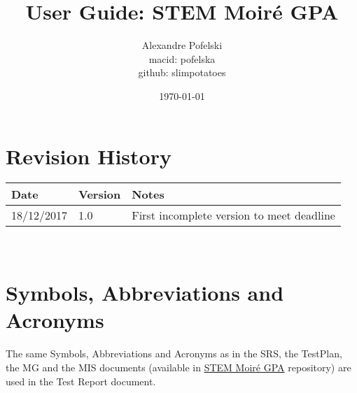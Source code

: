 \documentclass[12pt, titlepage]{article}
\newcommand{\progname}{STEM Moir{\'e} GPA}
\begin{document}
\title{User Guide: STEM Moir{\'e} GPA} 
\author{Alexandre Pofelski \\
		macid: pofelska \\
		github: slimpotatoes}
\date{\today}
	
\maketitle


\section{Revision History}

\begin{tabularx}{\textwidth}{p{3cm}p{2cm}X}
\toprule {\bf Date} & {\bf Version} & {\bf Notes}\\
\midrule
18/12/2017 & 1.0 & First incomplete version to meet deadline\\
\bottomrule
\end{tabularx}

~\newpage

\section{Symbols, Abbreviations and Acronyms}

The same Symbols, Abbreviations and Acronyms as in the SRS, the TestPlan, the 
MG and the MIS documents (available in 
\href{https://github.com/slimpotatoes/STEM_Moire_GPA}{\progname{}} repository) 
are used in the Test Report document. 

\newpage

\tableofcontents

\listoftables %

\listoffigures %

\newpage





\end{document}
